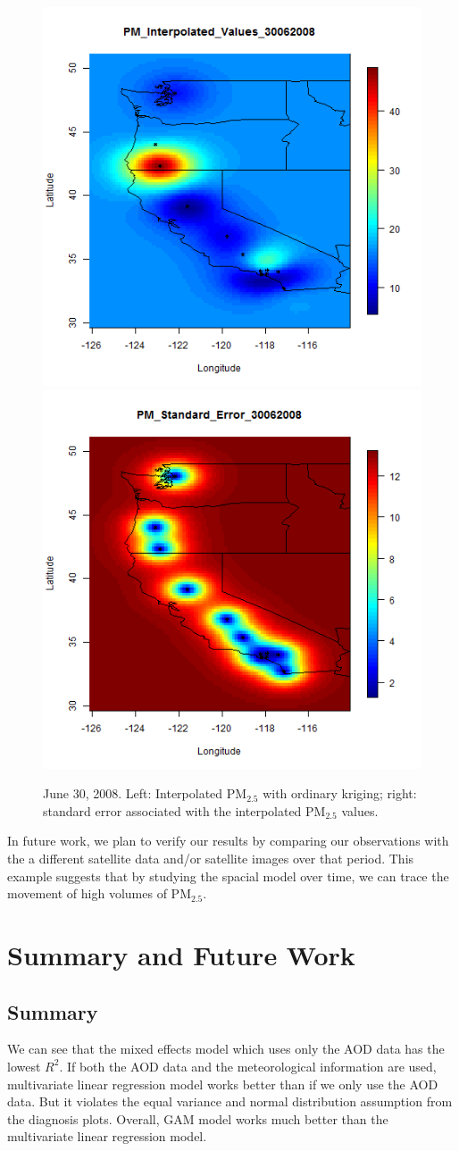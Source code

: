 \documentclass[10pt]{article}
\begin{document}
\begin{figure}[H]
\centering
  \includegraphics[width=.45\textwidth]{Interpolated_PM2008_0182.png}
  \includegraphics[width= .45\textwidth]{Standard_Error_PM2008_0182.png}
\caption{June 30, 2008.  Left: Interpolated PM$_{2.5}$ with ordinary kriging; right:
standard error associated with the interpolated PM$_{2.5}$ values.}
\label{june30}
\end{figure}


In future work, we plan to verify our results by comparing our observations with the a
different satellite data and/or satellite images over that period. This example
suggests that by studying the spacial model over time, we can trace the
movement of high volumes of PM$_{2.5}$.



\section{Summary and Future Work}
\subsection{Summary}

We can see that the mixed effects model which uses only the AOD data has
the lowest $R^2$. If both the AOD data and the meteorological information are
used, multivariate linear regression model works better than if we only use the
AOD data. But it violates the equal variance and normal distribution assumption
from the diagnosis plots. Overall, GAM model works much better than the
multivariate linear regression model.
\end{document}
